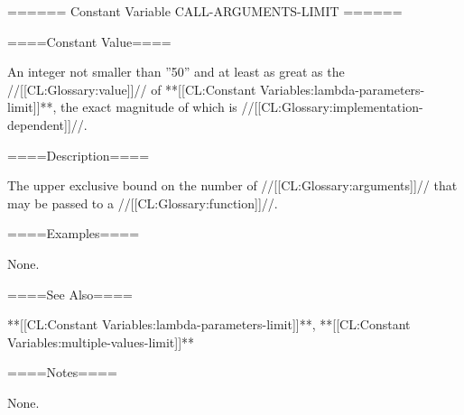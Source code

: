 ====== Constant Variable CALL-ARGUMENTS-LIMIT ======

====Constant Value====

An integer not smaller than ''50'' and at least as great as the //[[CL:Glossary:value]]// of **[[CL:Constant Variables:lambda-parameters-limit]]**, the exact magnitude of which is //[[CL:Glossary:implementation-dependent]]//.

====Description====

The upper exclusive bound on the number of //[[CL:Glossary:arguments]]// that may be passed to a //[[CL:Glossary:function]]//.

====Examples====

None.

====See Also====

**[[CL:Constant Variables:lambda-parameters-limit]]**, **[[CL:Constant Variables:multiple-values-limit]]**

====Notes====

None.

